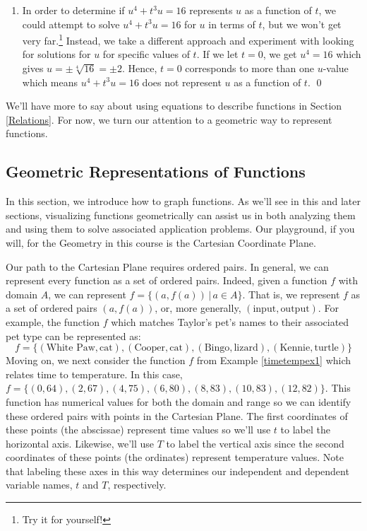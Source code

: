 \begin{ex}
\begin{enumerate}
\begin{enumerate}
\item  In order to determine if  $u^{4} + t^{3}u = 16$ represents $u$ as a function of $t$, we could attempt to solve $u^{4} + t^{3}u = 16$ for $u$ in terms of $t$, but we won't get very far.\footnote{Try it for yourself!}  Instead, we take a different approach and experiment with looking for solutions for $u$ for specific values of $t$.  If we let $t = 0$, we get $u^{4} = 16$ which gives $u = \pm \sqrt[4]{16} = \pm 2$.  Hence, $t = 0$ corresponds to more than one $u$-value which means  $u^{4}  +t^{3}u = 16$  does not represent $u$ as a function of $t$.  \qed

\end{enumerate}

\end{enumerate}

\end{ex}

We'll have more to say about using equations to describe functions in Section \ref{Relations}.  For now, we turn our attention to a geometric way to represent functions.

\subsection{Geometric Representations of Functions}

In this section, we introduce how to graph functions.  As we'll see in this and later sections, visualizing functions geometrically can assist us in both analyzing them and using them to solve associated application problems.  Our playground, if you will, for the Geometry in this course is the Cartesian Coordinate Plane.  

\medskip

Our path to the Cartesian Plane requires ordered pairs.  In general, we can represent every function as a set of ordered pairs.  Indeed, given a function $f$ with domain $A$, we can represent $f = \{ (a, f(a)) \, | \, a \in A\}$.  That is, we represent $f$ as a set of ordered pairs $(a, f(a))$, or, more generally, $(\text{input}, \text{output})$.  For example, the function $f$ which matches Taylor's pet's names to their associated pet type can be represented as: \[ f = \{ (\text{White Paw}, \text{cat}), (\text{Cooper}, \text{cat}), (\text{Bingo}, \text{lizard}), (\text{Kennie}, \text{turtle}) \} \] Moving on, we next  consider the function $f$ from Example \ref{timetempex1} which relates time to temperature. In this case,  $f = \{ (0, 64), (2, 67), (4, 75), (6, 80), (8, 83), (10, 83), (12, 82) \}$.   This function has numerical values for both the domain and range so we can identify these ordered pairs with points in the Cartesian Plane.  The first coordinates of these points (the abscissae) represent time values so we'll use $t$ to label the horizontal axis.  Likewise, we'll use $T$ to label the vertical axis since the second coordinates of these points (the ordinates) represent temperature values.  Note that labeling these axes in this way determines our independent and dependent variable names, $t$ and $T$, respectively.

